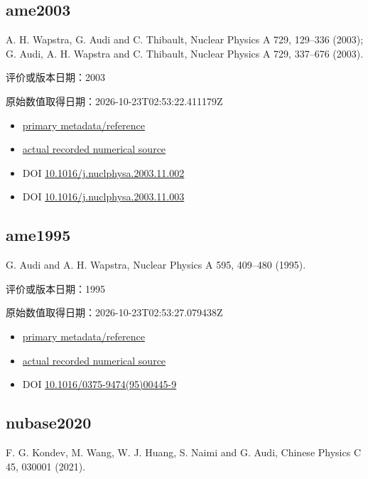 \documentclass[
  11pt,
  letterpaper,
]{article}
\providecommand{\tightlist}{%
  \setlength{\itemsep}{0pt}\setlength{\parskip}{0pt}}
\begin{document}
\subsection{ame2003}\label{ame2003}

A. H. Wapstra, G. Audi and C. Thibault, Nuclear Physics A 729, 129--336
(2003); G. Audi, A. H. Wapstra and C. Thibault, Nuclear Physics A 729,
337--676 (2003).

评价或版本日期：2003

原始数值取得日期：2026-10-23T02:53:22.411179Z

\begin{itemize}
\tightlist
\item
  \href{https://www-nds.iaea.org/amdc/}{primary metadata/reference}
\item
  \href{https://amdc.impcas.ac.cn/masstables/Ame2003/mass.mas03}{actual
  recorded numerical source}
\item
  DOI
  \href{https://doi.org/10.1016/j.nuclphysa.2003.11.002}{10.1016/j.nuclphysa.2003.11.002}
\item
  DOI
  \href{https://doi.org/10.1016/j.nuclphysa.2003.11.003}{10.1016/j.nuclphysa.2003.11.003}
\end{itemize}

\subsection{ame1995}\label{ame1995}

G. Audi and A. H. Wapstra, Nuclear Physics A 595, 409--480 (1995).

评价或版本日期：1995

原始数值取得日期：2026-10-23T02:53:27.079438Z

\begin{itemize}
\tightlist
\item
  \href{https://www-nds.iaea.org/amdc/}{primary metadata/reference}
\item
  \href{https://amdc.impcas.ac.cn/masstables/Ame1995/mass_rmd.mas95}{actual
  recorded numerical source}
\item
  DOI
  \href{https://doi.org/10.1016/0375-9474(95)00445-9}{10.1016/0375-9474(95)00445-9}
\end{itemize}

\subsection{nubase2020}\label{nubase2020}

F. G. Kondev, M. Wang, W. J. Huang, S. Naimi and G. Audi, Chinese
Physics C 45, 030001 (2021).
\end{document}
